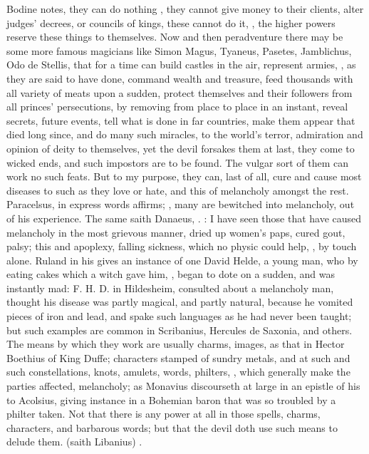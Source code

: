 Bodine notes, they can do nothing , they cannot give money to their clients, alter judges' decrees, or
councils of kings, these  cannot do it, , the higher powers reserve these things to themselves. Now
and then peradventure there may be some more famous magicians like Simon Magus,
\Apollonius{} Tyaneus, Pasetes, Jamblichus,
Odo de Stellis, that for a time can build castles in the
air, represent armies, \etc{}, as they are said to have
done, command wealth and treasure, feed thousands with all variety of meats
upon a sudden, protect themselves and their followers from all princes'
persecutions, by removing from place to place in an instant, reveal secrets,
future events, tell what is done in far countries, make them appear that died
long since, and do many such miracles, to the world's terror, admiration and
opinion of deity to themselves, yet the devil forsakes them at last, they come
to wicked ends, and  such impostors are to be found. The
vulgar sort of them can work no such feats. But to my purpose, they can, last
of all, cure and cause most diseases to such as they love or hate, and this of
melancholy amongst the rest. Paracelsus,
 in express words
affirms; , many are bewitched into
melancholy, out of his experience. The same saith Danaeus,
. : I have seen those that have
caused melancholy in the most grievous manner, dried up
women's paps, cured gout, palsy; this and apoplexy, falling sickness, which no
physic could help, , by touch alone. Ruland in his
 gives an instance of one David Helde, a
young man, who by eating cakes which a witch gave him, , began to dote on a sudden, and was instantly mad: F. H. D. in
Hildesheim, consulted about a melancholy man, thought his
disease was partly magical, and partly natural, because he vomited pieces of
iron and lead, and spake such languages as he had never been taught; but such
examples are common in Scribanius, Hercules de Saxonia, and others. The means
by which they work are usually charms, images, as that in Hector Boethius of
King Duffe; characters stamped of sundry metals, and at such and such
constellations, knots, amulets, words, philters, \etc{}, which generally make
the parties affected, melancholy; as Monavius discourseth
at large in an epistle of his to Acolsius, giving instance in a Bohemian baron
that was so troubled by a philter taken. Not that there is any power at all in
those spells, charms, characters, and barbarous words; but that the devil doth
use such means to delude them.  (saith
Libanius) .

